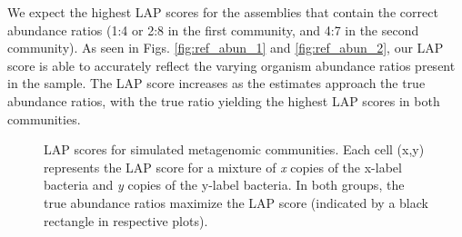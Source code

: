 \documentclass[12pt,\mydriver]{thesis}
\begin{document}
We expect the highest LAP scores for the assemblies that contain the correct abundance ratios (1:4 or 2:8 in the first community, and 4:7 in the second community).
As seen in Figs. \ref{fig:ref_abun_1} and \ref{fig:ref_abun_2}, our LAP score is able to accurately reflect the varying organism abundance ratios present in the sample.
The LAP score increases as the estimates approach the true abundance ratios, with the true ratio yielding the highest LAP scores in both communities.

\begin{figure}
\begin{center}

\hfil
{}
\end{center}
\renewcommand{\baselinestretch}{1}
\small\normalsize
\begin{quote}
\caption[LAP scores for simulated metagenomic communities.] {LAP scores for simulated metagenomic communities. Each cell (x,y) represents the LAP score for a mixture of \emph{x} copies of the x-label bacteria and \emph{y} copies of the y-label bacteria.  In both groups, the true abundance ratios maximize the LAP score (indicated by a black rectangle in respective plots). \label{fig:ref_abun}}
\end{quote}
\end{figure}
\renewcommand{\baselinestretch}{2}
\small\normalsize
\end{document}
